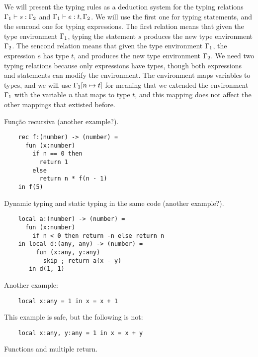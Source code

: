 We will present the typing rules as a deduction system for the typing
relations $\Gamma_{1} \vdash s : \Gamma_{2}$ and $\Gamma_{1} \vdash e : t, \Gamma_{2}$. 
We will use the first one for typing statements, and the sencond one
for typing expressions. 
The first relation means that given the type environment $\Gamma_{1}$,
typing the statement $s$ produces the new type environment $\Gamma_{2}$. 
The sencond relation means that given the type environment $\Gamma_{1}$,
the expression $e$ has type $t$, and produces the new type environment $\Gamma_{2}$.
We need two typing relations because only expressions have types,
though both expressions and statements can modify the environment.
The environment maps variables to types, and we will use $\Gamma_{1}[n \mapsto t]$
for meaning that we extended the environment $\Gamma_{1}$ with the
variable $n$ that maps to type $t$, and this mapping does not affect
the other mappings that extisted before.

Função recursiva (another example?).

\begin{verbatim}
    rec f:(number) -> (number) =
      fun (x:number)
        if n == 0 then
          return 1
        else
          return n * f(n - 1)
    in f(5)
\end{verbatim}

Dynamic typing and static typing in the same code (another example?).

\begin{verbatim}
    local a:(number) -> (number) =
      fun (x:number)
        if n < 0 then return -n else return n
    in local d:(any, any) -> (number) =
         fun (x:any, y:any)
           skip ; return a(x - y)
       in d(1, 1)
\end{verbatim}

Another example:

\begin{verbatim}
    local x:any = 1 in x = x + 1
\end{verbatim}

This example is safe, but the following is not:

\begin{verbatim}
    local x:any, y:any = 1 in x = x + y
\end{verbatim}

Functions and multiple return.

